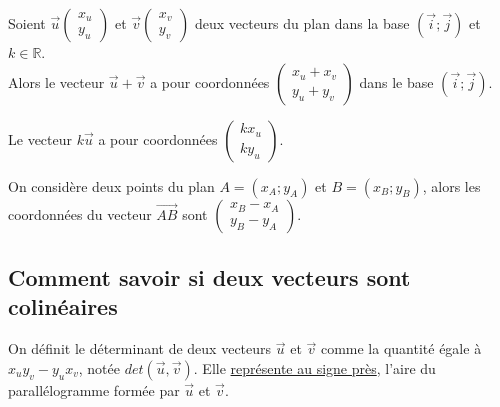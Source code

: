 \documentclass[french]{book}
\begin{document}
\begin{prop} 

Soient $\overrightarrow{u} \left( \begin{array}{c}
x_u \\
y_u 
\end{array} \right)$ et $\overrightarrow{v} \left( \begin{array}{c}
x_v \\
y_v 
\end{array} \right)$ deux vecteurs du plan dans la base  $(\overrightarrow{i};\overrightarrow{j})$ et $k \in \mathbb{R}$.\\
Alors le vecteur $\overrightarrow{u}+ \overrightarrow{v}$ a pour coordonnées $\left( \begin{array}{c}
x_u+x_v \\
y_u+y_v 
\end{array} \right)$ dans le base $(\overrightarrow{i};\overrightarrow{j})$.

Le vecteur $k\overrightarrow{u}$ a pour coordonnées $\left( \begin{array}{c}
k x_u \\
k y_u 
\end{array} \right)$. 
\end{prop}

\begin{prop}

On considère deux points du plan $A=(x_A;y_A)$ et $B=(x_B;y_B)$, alors les coordonnées du vecteur $\overrightarrow{AB}$ sont $\left( \begin{array}{c}
x_B - x_A \\
y_B - y_A 
\end{array} \right)$.

\end{prop}

\newpage

\subsection{Comment savoir si deux vecteurs sont colinéaires}

\begin{defn}
On définit le déterminant de deux vecteurs $\overrightarrow{u}$ et $\overrightarrow{v}$ comme la quantité égale à $x_u y_v - y_u x_v $, notée $det(\overrightarrow{u}, \overrightarrow{v})$. Elle \underline{représente au signe près}, l’aire du parallélogramme formée par $\overrightarrow{u}$ et $\overrightarrow{v}$.  
\end{defn}
\end{document}

